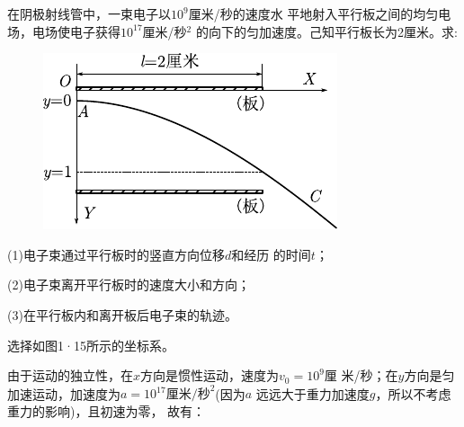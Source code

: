 \example 在阴极射线管中，一束电子以$10^9$厘米/秒的速度水
平地射入平行板之间的均匀电场，电场使电子获得$10^17$厘米/秒$^2$
的向下的匀加速度。己知平行板长为2厘米。求:

\begin{figure}
    \centering
    \includegraphics{figure/fig01.15}
    \caption{}
    \label{fig:01.15}
\end{figure}
(1)电子束通过平行板时的竖直方向位移$d$和经历
的时间$t$；

(2)电子束离开平行板时的速度大小和方向；

(3)在平行板内和离开板后电子束的轨迹。

\solution 选择如图1·15所示的坐标系。

由于运动的独立性，在$x$方向是惯性运动，速度为$v_0=10^9$厘
米/秒；在$y$方向是匀加速运动，加速度为$a=10^{17}\text{厘米/秒}^2$(因为$a$
远远大于重力加速度$g$，所以不考虑重力的影响)，且初速为零，
故有：

